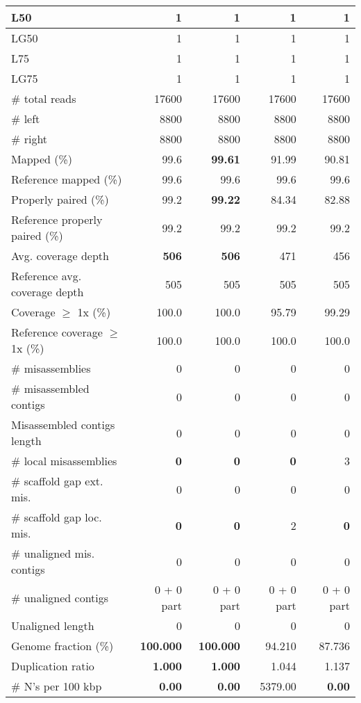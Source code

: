 \documentclass[12pt,a4paper]{article}
\begin{document}
\begin{table}[ht]
\begin{center}
\begin{tabular}{|l*{4}{|r}|}
L50 & 1 & 1 & 1 & 1 \\ \hline
LG50 & 1 & 1 & 1 & 1 \\ \hline
L75 & 1 & 1 & 1 & 1 \\ \hline
LG75 & 1 & 1 & 1 & 1 \\ \hline
\# total reads & 17600 & 17600 & 17600 & 17600 \\ \hline
\# left & 8800 & 8800 & 8800 & 8800 \\ \hline
\# right & 8800 & 8800 & 8800 & 8800 \\ \hline
Mapped (\%) & 99.6 & {\bf 99.61} & 91.99 & 90.81 \\ \hline
Reference mapped (\%) & 99.6 & 99.6 & 99.6 & 99.6 \\ \hline
Properly paired (\%) & 99.2 & {\bf 99.22} & 84.34 & 82.88 \\ \hline
Reference properly paired (\%) & 99.2 & 99.2 & 99.2 & 99.2 \\ \hline
Avg. coverage depth & {\bf 506} & {\bf 506} & 471 & 456 \\ \hline
Reference avg. coverage depth & 505 & 505 & 505 & 505 \\ \hline
Coverage $\geq$ 1x (\%) & 100.0 & 100.0 & 95.79 & 99.29 \\ \hline
Reference coverage $\geq$ 1x (\%) & 100.0 & 100.0 & 100.0 & 100.0 \\ \hline
\# misassemblies & 0 & 0 & 0 & 0 \\ \hline
\# misassembled contigs & 0 & 0 & 0 & 0 \\ \hline
Misassembled contigs length & 0 & 0 & 0 & 0 \\ \hline
\# local misassemblies & {\bf 0} & {\bf 0} & {\bf 0} & 3 \\ \hline
\# scaffold gap ext. mis. & 0 & 0 & 0 & 0 \\ \hline
\# scaffold gap loc. mis. & {\bf 0} & {\bf 0} & 2 & {\bf 0} \\ \hline
\# unaligned mis. contigs & 0 & 0 & 0 & 0 \\ \hline
\# unaligned contigs & 0 + 0 part & 0 + 0 part & 0 + 0 part & 0 + 0 part \\ \hline
Unaligned length & 0 & 0 & 0 & 0 \\ \hline
Genome fraction (\%) & {\bf 100.000} & {\bf 100.000} & 94.210 & 87.736 \\ \hline
Duplication ratio & {\bf 1.000} & {\bf 1.000} & 1.044 & 1.137 \\ \hline
\# N's per 100 kbp & {\bf 0.00} & {\bf 0.00} & 5379.00 & {\bf 0.00} \\ \hline

\end{tabular}
\end{center}
\end{table}
\end{document}
